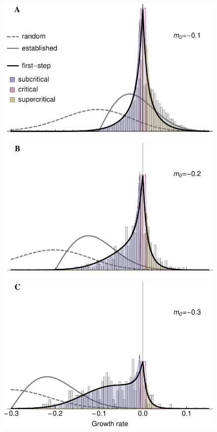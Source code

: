 \documentclass[9pt,twocolumn,twoside,lineno]{gsajnl}
\begin{document}
\begin{figure}[htbp]
\centering
\includegraphics[width=\linewidth]{../IMAGES/firststep_smallm0_regimes.pdf}\\
\includegraphics[width=\linewidth]{../IMAGES/firststep_medm0_regimes.pdf}\\
\includegraphics[width=\linewidth]{../IMAGES/firststep_largem0_regimes.pdf}\\

\end{figure}
\end{document}
